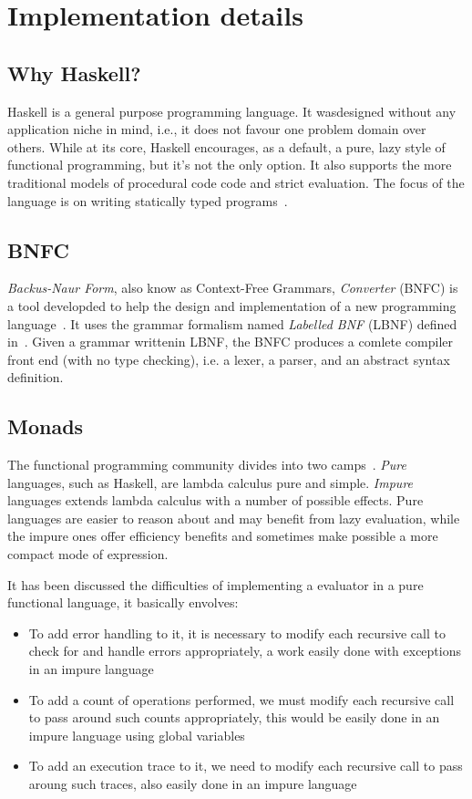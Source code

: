\chapter{Implementation details}

\section{Why Haskell?}

Haskell is a general purpose programming language. It wasdesigned without any
application niche in mind, i.e., it does not favour one problem domain over
others. While at its core, Haskell encourages, as a default, a pure, lazy style of
functional programming, but it's not the only option. It also supports the more
traditional models of procedural code code and strict evaluation. The focus of
the language is on writing statically typed programs~\cite{rwhaskell}. 

\section{BNFC}
\textit{Backus-Naur Form}, also know as Context-Free Grammars,
\textit{Converter} (BNFC) is a tool developded to help the design and
implementation of a new programming language~\cite{bnfcsite}. 
It uses the grammar formalism named \textit{Labelled BNF} (LBNF) defined
in~\cite{bnfc}. Given a grammar writtenin LBNF, the BNFC produces a comlete
compiler front end (with no type checking), i.e. a lexer, a parser, and an
abstract syntax definition.

\section{Monads}

The functional programming community divides into two camps~\cite{monadswadler}.
\textit{Pure} languages, such as Haskell, are lambda calculus pure and simple.
\textit{Impure} languages extends lambda calculus with a number of possible
effects. Pure languages are easier to reason about and may benefit from lazy
evaluation, while the impure ones offer efficiency benefits and sometimes make
possible a more compact mode of expression. 

It has been discussed the difficulties of implementing a evaluator in a pure
functional language, it basically envolves:
\begin{itemize}
\item To add error handling to it, it is necessary to modify each recursive call to
check for and handle errors appropriately, a work easily done with exceptions in
an impure language
\item To add a count of operations performed, we must modify each
recursive call to pass around such counts appropriately, this would be easily
done in an impure language using global variables
\item To add an execution trace to it, we need to modify each recursive call to
pass aroung such traces, also easily done in an impure language
\end{itemize}


